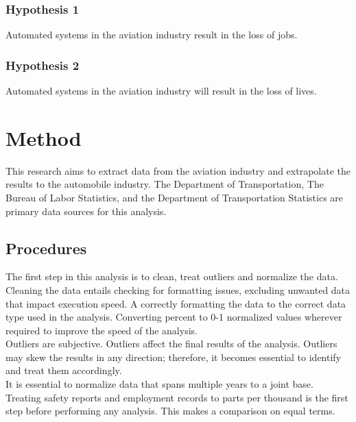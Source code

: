 \documentclass[
  man,floatsintext]{apa7}
\begin{document}
\hypertarget{hypothesis-1}{%
\subsubsection{Hypothesis 1}\label{hypothesis-1}}

Automated systems in the aviation industry result in the loss of jobs.

\hypertarget{hypothesis-2}{%
\subsubsection{Hypothesis 2}\label{hypothesis-2}}

Automated systems in the aviation industry will result in the loss of lives.

\hypertarget{method}{%
\section{Method}\label{method}}

This research aims to extract data from the aviation industry and extrapolate the results to the automobile industry. The Department of Transportation, The Bureau of Labor Statistics, and the Department of Transportation Statistics are primary data sources for this analysis.\\

\hypertarget{procedures}{%
\subsection{Procedures}\label{procedures}}

The first step in this analysis is to clean, treat outliers and normalize the data. Cleaning the data entails checking for formatting issues, excluding unwanted data that impact execution speed. A correctly formatting the data to the correct data type used in the analysis. Converting percent to 0-1 normalized values wherever required to improve the speed of the analysis.\\

Outliers are subjective. Outliers affect the final results of the analysis. Outliers may skew the results in any direction; therefore, it becomes essential to identify and treat them accordingly.\\
It is essential to normalize data that spans multiple years to a joint base. Treating safety reports and employment records to parts per thousand is the first step before performing any analysis. This makes a comparison on equal terms.\\
\end{document}
